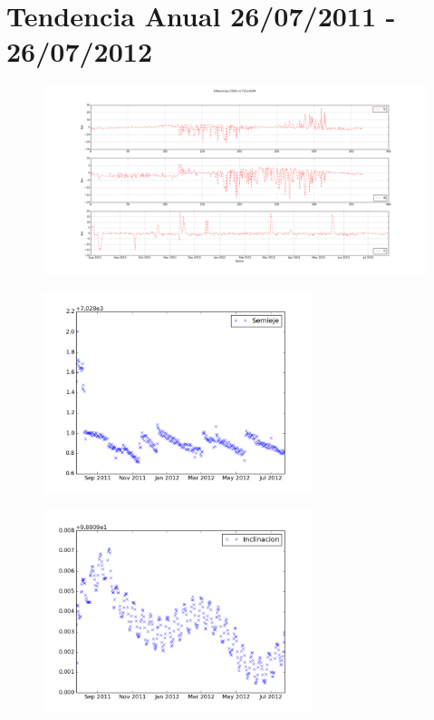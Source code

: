 \section{Tendencia Anual 26/07/2011 - 26/07/2012}
\begin{figure}[!h]
\centering
  \includegraphics[width=\textwidth]{imagenes/sacDtendenciaAnualVNC}
\end{figure}
\begin{figure}[!h]
\centering
  \includegraphics[width=0.7\textwidth]{imagenes/sacDtendSemi}
\end{figure}
\begin{figure}[!h]
\centering
  \includegraphics[width=0.7\textwidth]{imagenes/sacDtendInc}
\end{figure}



